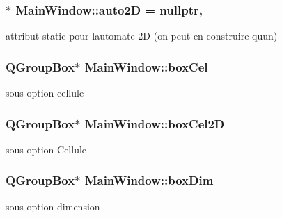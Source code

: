 \subsubsection[{\texorpdfstring{auto2D}{auto2D}}]{ $\ast$ Main\+Window\+::auto2D = nullptr\hspace{0.3cm}{\ttfamily [static]}, {\ttfamily [private]}}\hypertarget{class_main_window_ae1a48aa4de447712675f3aa2d7482034}{}\label{class_main_window_ae1a48aa4de447712675f3aa2d7482034}
attribut static pour l\textquotesingle{}automate 2D (on peut en construire qu\textquotesingle{}un) 
\subsubsection[{\texorpdfstring{box\+Cel}{boxCel}}]{\setlength{\rightskip}{0pt plus 5cm}Q\+Group\+Box$\ast$ Main\+Window\+::box\+Cel\hspace{0.3cm}{\ttfamily [private]}}\hypertarget{class_main_window_ac7c010cdcd4cafe4a9ac0b87ad384b8a}{}\label{class_main_window_ac7c010cdcd4cafe4a9ac0b87ad384b8a}
sous option cellule 
\subsubsection[{\texorpdfstring{box\+Cel2D}{boxCel2D}}]{\setlength{\rightskip}{0pt plus 5cm}Q\+Group\+Box$\ast$ Main\+Window\+::box\+Cel2D\hspace{0.3cm}{\ttfamily [private]}}\hypertarget{class_main_window_a1d591f82ca53c455c4a5204f8baad925}{}\label{class_main_window_a1d591f82ca53c455c4a5204f8baad925}
sous option Cellule 
\subsubsection[{\texorpdfstring{box\+Dim}{boxDim}}]{\setlength{\rightskip}{0pt plus 5cm}Q\+Group\+Box$\ast$ Main\+Window\+::box\+Dim\hspace{0.3cm}{\ttfamily [private]}}\hypertarget{class_main_window_a69406bb359d08dd42c0a05957ae89b51}{}\label{class_main_window_a69406bb359d08dd42c0a05957ae89b51}
sous option dimension 
